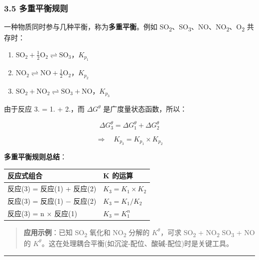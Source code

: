 \subsubsection{3.5 多重平衡规则}\label{ux591aux91cdux5e73ux8861ux89c4ux5219}

一种物质同时参与几种平衡，称为\textbf{多重平衡}。例如 SO\textsubscript{2}、SO\textsubscript{3}、NO、NO\textsubscript{2}、O\textsubscript{2} 共存时：

\begin{enumerate}
\def\labelenumi{\arabic{enumi}.}
\tightlist
\item
  \(\mathrm{SO_2 + \frac{1}{2}O_2 \rightleftharpoons SO_3}\)，\(K_{p_1}\)
\item
  \(\mathrm{NO_2 \rightleftharpoons NO + \frac{1}{2}O_2}\)，\(K_{p_2}\)
\item
  \(\mathrm{SO_2 + NO_2 \rightleftharpoons SO_3 + NO}\)，\(K_{p_3}\)
\end{enumerate}

由于反应 3. = 1. + 2.，而 \(\Delta G^\theta\) 是广度量状态函数，所以：

\[
\Delta G_3^\theta = \Delta G_1^\theta + \Delta G_2^\theta
\]

\[
\Rightarrow \quad \boxed{K_{p_3} = K_{p_1} \times K_{p_2}}
\]

\textbf{多重平衡规则总结}：

{\def\LTcaptype{none} %
\begin{longtable}[]{@{}ll@{}}
\toprule\noalign{}
反应式组合 & K 的运算 \\
\midrule\noalign{}
\endhead
\bottomrule\noalign{}
\endlastfoot
反应(3) = 反应(1) + 反应(2) & \(K_3 = K_1 \times K_2\) \\
反应(3) = 反应(1) − 反应(2) & \(K_3 = K_1 / K_2\) \\
反应(3) = n × 反应(1) & \(K_3 = K_1^n\) \\
\end{longtable}
}

\begin{quote}
\textbf{应用示例}：已知 SO\textsubscript{2} 氧化和 NO\textsubscript{2} 分解的 \(K^\theta\)，可求 SO\textsubscript{2} + NO\textsubscript{2} \箭 SO\textsubscript{3} + NO 的 \(K^\theta\)。这在处理耦合平衡(如沉淀-配位、酸碱-配位)时是关键工具。
\end{quote}

\begin{center}\rule{0.5\linewidth}{0.5pt}\end{center}

